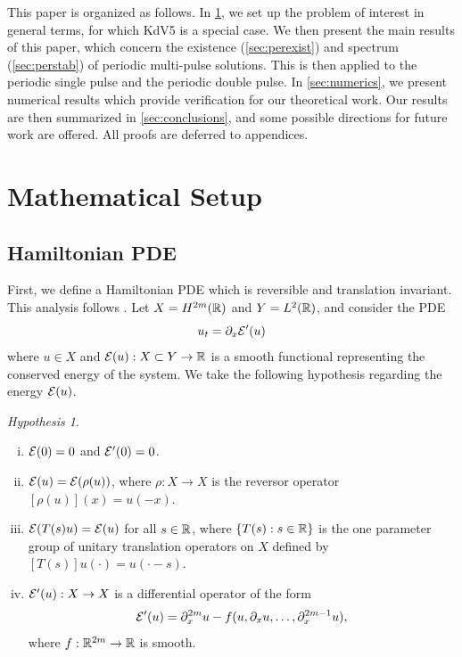 \documentclass[11pt,reqno]{amsart}
\theoremstyle{plain}
\theoremstyle{definition}
\theoremstyle{remark}
\newtheorem{hypothesis}[theorem]{Hypothesis}
\begin{document}
This paper is organized as follows. In \cref{sec:setup}, we set up the problem of interest in general terms, for which KdV5 is a special case. We then present the main results of this paper, which concern the existence (\cref{sec:perexist}) and spectrum (\cref{sec:perstab}) of periodic multi-pulse solutions. This is then applied to the periodic single pulse and the periodic double pulse. In \cref{sec:numerics}, we present numerical results which provide verification for our theoretical work. Our results are then summarized in \cref{sec:conclusions}, and some possible directions for future work are offered. All proofs are deferred to appendices.

\section{Mathematical Setup}\label{sec:setup}

\subsection{Hamiltonian PDE}\label{sec:HamPDE}

First, we define a Hamiltonian PDE which is reversible and translation invariant. This analysis follows \cite{Grillakis1987}. Let $X = H^{2m}(\mathbb{R})$ and $Y = L^2(\mathbb{R})$, and consider the PDE
\begin{equation}\label{genPDE}
u_t = \partial_x \mathcal{E}'(u)
\end{equation}
where $u \in X$ and $\mathcal{E}(u): X \subset Y \rightarrow \mathbb{R}$ is a smooth functional representing the conserved energy of the system. We take the following hypothesis regarding the energy $\mathcal{E}(u)$.

\begin{hypothesis}\label{Ehyp}\leavevmode
\begin{enumerate}[(i)]
\item $\mathcal{E}(0) = 0$ and $\mathcal{E}'(0) = 0$.
\item $\mathcal{E}(u) = \mathcal{E}(\rho(u))$, where $\rho: X \rightarrow X$ is the reversor operator $[\rho(u)](x) = u(-x)$.
\item $\mathcal{E}(T(s)u) = \mathcal{E}(u)$ for all $s \in \mathbb{R}$, where $\{T(s) : s \in \mathbb{R} \}$ is the one parameter group of unitary translation operators on $X$ defined by $[T(s)]u(\cdot) = u(\cdot - s)$.
\item $\mathcal{E}'(u): X \rightarrow X$ is a differential operator of the form
\begin{equation}\label{Eprimeuform}
\mathcal{E}'(u) = \partial_x^{2m}u - f(u, \partial_x u, \dots, \partial_x^{2m-1} u),
\end{equation}
where $f: \mathbb{R}^{2m} \rightarrow \mathbb{R}$ is smooth.
\end{enumerate}
\end{hypothesis}
\end{document}
